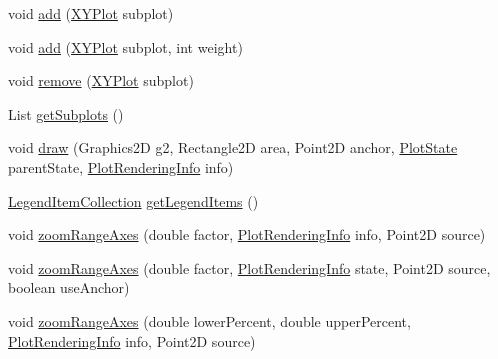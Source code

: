 \begin{DoxyCompactItemize}
\item 
void \mbox{\hyperlink{classorg_1_1jfree_1_1chart_1_1plot_1_1_combined_domain_x_y_plot_a5ee97545844c0a08b3687a9313c20023}{add}} (\mbox{\hyperlink{classorg_1_1jfree_1_1chart_1_1plot_1_1_x_y_plot}{X\+Y\+Plot}} subplot)
\item 
void \mbox{\hyperlink{classorg_1_1jfree_1_1chart_1_1plot_1_1_combined_domain_x_y_plot_a99f4c4a98405fbf0d106e8345e04e724}{add}} (\mbox{\hyperlink{classorg_1_1jfree_1_1chart_1_1plot_1_1_x_y_plot}{X\+Y\+Plot}} subplot, int weight)
\item 
void \mbox{\hyperlink{classorg_1_1jfree_1_1chart_1_1plot_1_1_combined_domain_x_y_plot_a7f9352e13315496bb8a012453358891b}{remove}} (\mbox{\hyperlink{classorg_1_1jfree_1_1chart_1_1plot_1_1_x_y_plot}{X\+Y\+Plot}} subplot)
\item 
List \mbox{\hyperlink{classorg_1_1jfree_1_1chart_1_1plot_1_1_combined_domain_x_y_plot_ac21fbd2a7c52c7f7fdebf2ae37f662ff}{get\+Subplots}} ()
\item 
void \mbox{\hyperlink{classorg_1_1jfree_1_1chart_1_1plot_1_1_combined_domain_x_y_plot_ac05d1ead7848fd9cead359a49c97c983}{draw}} (Graphics2D g2, Rectangle2D area, Point2D anchor, \mbox{\hyperlink{classorg_1_1jfree_1_1chart_1_1plot_1_1_plot_state}{Plot\+State}} parent\+State, \mbox{\hyperlink{classorg_1_1jfree_1_1chart_1_1plot_1_1_plot_rendering_info}{Plot\+Rendering\+Info}} info)
\item 
\mbox{\hyperlink{classorg_1_1jfree_1_1chart_1_1_legend_item_collection}{Legend\+Item\+Collection}} \mbox{\hyperlink{classorg_1_1jfree_1_1chart_1_1plot_1_1_combined_domain_x_y_plot_a97116ae980d7a928848db0ce0c0bcbe7}{get\+Legend\+Items}} ()
\item 
void \mbox{\hyperlink{classorg_1_1jfree_1_1chart_1_1plot_1_1_combined_domain_x_y_plot_a561639c8c710104403d3eb71799b4550}{zoom\+Range\+Axes}} (double factor, \mbox{\hyperlink{classorg_1_1jfree_1_1chart_1_1plot_1_1_plot_rendering_info}{Plot\+Rendering\+Info}} info, Point2D source)
\item 
void \mbox{\hyperlink{classorg_1_1jfree_1_1chart_1_1plot_1_1_combined_domain_x_y_plot_a5339ad02fe1b8ca65a4ba2acfbc89f92}{zoom\+Range\+Axes}} (double factor, \mbox{\hyperlink{classorg_1_1jfree_1_1chart_1_1plot_1_1_plot_rendering_info}{Plot\+Rendering\+Info}} state, Point2D source, boolean use\+Anchor)
\item 
void \mbox{\hyperlink{classorg_1_1jfree_1_1chart_1_1plot_1_1_combined_domain_x_y_plot_ac9a94a2ee716bca23870d7c7731078ac}{zoom\+Range\+Axes}} (double lower\+Percent, double upper\+Percent, \mbox{\hyperlink{classorg_1_1jfree_1_1chart_1_1plot_1_1_plot_rendering_info}{Plot\+Rendering\+Info}} info, Point2D source)

\end{DoxyCompactItemize}
